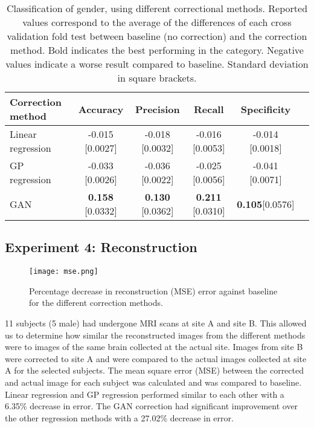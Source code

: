 \begin{table}[ht!]
  \centering
  \caption{Classification of gender, using different correctional methods. Reported values correspond to the average of the differences of each cross validation fold test between baseline (no correction) and the correction method. Bold indicates the best performing in the category. Negative values indicate a worse result compared to baseline. Standard deviation in square brackets.}
    \begin{tabular}{l|ccccc}
    \toprule
    \textbf{Correction method} & \textbf{Accuracy} & \textbf{Precision}& \textbf{Recall}& \textbf{Specificity}\\
    \midrule
    Linear regression   &  -0.015 [0.0027] & -0.018 [0.0032] & -0.016 [0.0053] & -0.014 [0.0018]\\
    GP regression    &  -0.033 [0.0026] & -0.036 [0.0022] & -0.025 [0.0056] & -0.041 [0.0071]\\
    GAN    & \textbf{0.158} [0.0332] & \textbf{0.130} [0.0362] & \textbf{0.211} [0.0310] & \textbf{0.105}[0.0576]\\
    \bottomrule
    \end{tabular}%
  \label{tab:classify_gender}%
\end{table}

\subsection{Experiment 4: Reconstruction}

\begin{figure}[!ht]
\begin{center}
 \texttt{[image: mse.png]}
    \end{center}
  \caption{Percentage decrease in reconstruction (MSE) error against baseline for the different correction methods.}
  \label{fig:mse}
\end{figure}

11 subjects (5 male) had undergone MRI scans at site A and site B. This allowed us to determine how similar the reconstructed images from the different methods were to images of the same brain collected at the actual site. Images from site B were corrected to site A and were compared to the actual images collected at site A for the selected subjects. The mean square error (MSE) between the corrected and actual image for each subject was calculated and was compared to baseline. Linear regression and GP regression performed similar to each other with a 6.35\% decrease in error. The GAN correction had significant improvement over the other regression methods with a 27.02\% decrease in error.

